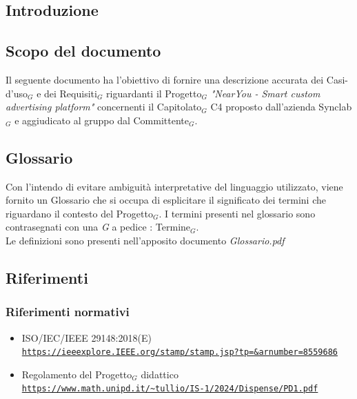 \documentclass[11pt]{article}
\begin{document}
\newpage
\tableofcontents
\newpage
\listoffigures
\newpage
\listoftables

\newpage
\begin{justify}

\section{Introduzione}
\label{sec:intro}

\subsection{Scopo del documento}

Il seguente documento ha l'obiettivo di fornire una descrizione accurata dei Casi-d'uso$_G$ e dei Requisiti$_G$ riguardanti il Progetto$_G$ \textit{"NearYou - 
Smart custom advertising platform"} concernenti il Capitolato$_G$ C4 proposto dall'azienda Synclab$_G$ e aggiudicato al gruppo dal Committente$_G$.


\subsection{Glossario}
Con l'intendo di evitare ambiguità interpretative del linguaggio utilizzato, viene fornito un Glossario che si occupa di esplicitare il significato dei termini che riguardano il contesto del Progetto$_G$. I termini presenti nel glossario sono contrasegnati con una \textit{G} a pedice : Termine$_G$.\\
Le definizioni sono presenti nell'apposito documento \textit{Glossario.pdf}


\subsection{Riferimenti}

\subsubsection{Riferimenti normativi}
\begin{itemize}
    \item[-] ISO/IEC/IEEE 29148:2018(E) \\
    \textcolor{blue}{\texttt{\url{https://ieeexplore.IEEE.org/stamp/stamp.jsp?tp=&arnumber=8559686}}}
    
    \item[-] Regolamento del Progetto$_G$ didattico  \\
    \textcolor{blue}{\texttt{\url{https://www.math.unipd.it/~tullio/IS-1/2024/Dispense/PD1.pdf}}}
    

\end{itemize}
\end{justify}
\end{document}
